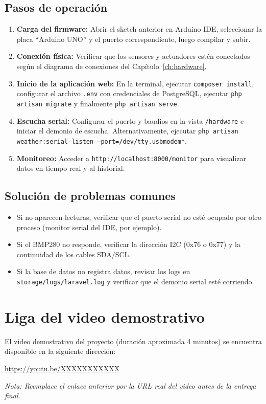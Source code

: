 \subsection{Pasos de operación}
\begin{enumerate}[leftmargin=*]
    \item \textbf{Carga del firmware:} Abrir el sketch anterior en Arduino IDE, seleccionar la placa ``Arduino UNO'' y el puerto correspondiente, luego compilar y subir.
    \item \textbf{Conexión física:} Verificar que los sensores y actuadores estén conectados según el diagrama de conexiones del Capítulo~\ref{ch:hardware}.
    \item \textbf{Inicio de la aplicación web:} En la terminal, ejecutar \texttt{composer install}, configurar el archivo \texttt{.env} con credenciales de PostgreSQL, ejecutar \texttt{php artisan migrate} y finalmente \texttt{php artisan serve}.
    \item \textbf{Escucha serial:} Configurar el puerto y baudios en la vista \texttt{/hardware} e iniciar el demonio de escucha. Alternativamente, ejecutar \texttt{php artisan weather:serial-listen --port=/dev/tty.usbmodem*}.
    \item \textbf{Monitoreo:} Acceder a \texttt{http://localhost:8000/monitor} para visualizar datos en tiempo real y al historial.
\end{enumerate}

\subsection{Solución de problemas comunes}
\begin{itemize}[leftmargin=*]
    \item Si no aparecen lecturas, verificar que el puerto serial no esté ocupado por otro proceso (monitor serial del IDE, por ejemplo).
    \item Si el BMP280 no responde, verificar la dirección I2C (0x76 o 0x77) y la continuidad de los cables SDA/SCL.
    \item Si la base de datos no registra datos, revisar los logs en \texttt{storage/logs/laravel.log} y verificar que el demonio serial esté corriendo.
\end{itemize}

\section{Liga del video demostrativo}

El video demostrativo del proyecto (duración aproximada 4 minutos) se encuentra disponible en la siguiente dirección:

\begin{center}
\url{https://youtu.be/XXXXXXXXXXX}
\end{center}

\textit{Nota: Reemplace el enlace anterior por la URL real del video antes de la entrega final.}
